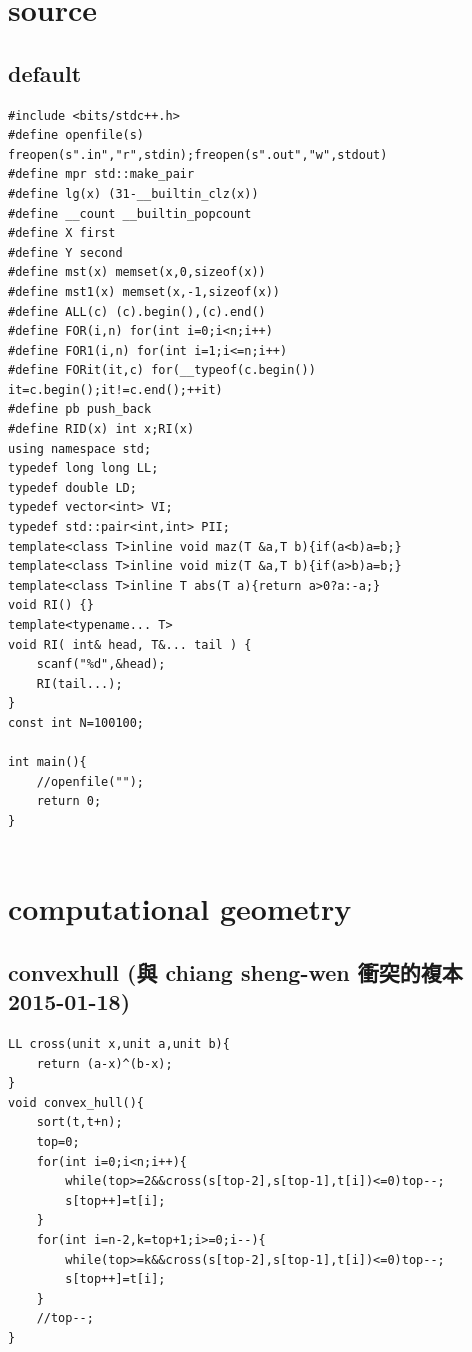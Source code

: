 \documentclass[10pt,twocolumn,oneside]{article}
\begin{document}
\pagestyle{fancy}
\fancyfoot{}
\fancyhead[R]{\thepage}
\renewcommand{\headrulewidth}{0.4pt}
\renewcommand{\contentsname}{Contents} 

\scriptsize
\tableofcontents

\section{source}
\subsection{default}
\begin{lstlisting}
#include <bits/stdc++.h>
#define openfile(s) freopen(s".in","r",stdin);freopen(s".out","w",stdout)
#define mpr std::make_pair
#define lg(x) (31-__builtin_clz(x))
#define __count __builtin_popcount
#define X first
#define Y second
#define mst(x) memset(x,0,sizeof(x))
#define mst1(x) memset(x,-1,sizeof(x))
#define ALL(c) (c).begin(),(c).end()
#define FOR(i,n) for(int i=0;i<n;i++)
#define FOR1(i,n) for(int i=1;i<=n;i++)
#define FORit(it,c) for(__typeof(c.begin()) it=c.begin();it!=c.end();++it)
#define pb push_back
#define RID(x) int x;RI(x)
using namespace std;
typedef long long LL;
typedef double LD;
typedef vector<int> VI;
typedef std::pair<int,int> PII;
template<class T>inline void maz(T &a,T b){if(a<b)a=b;}
template<class T>inline void miz(T &a,T b){if(a>b)a=b;}
template<class T>inline T abs(T a){return a>0?a:-a;}
void RI() {}
template<typename... T>
void RI( int& head, T&... tail ) {
    scanf("%d",&head);
    RI(tail...);
}
const int N=100100;

int main(){
	//openfile("");
	return 0;
}


\end{lstlisting}
\section{computational geometry}
\subsection{convexhull (與 chiang sheng-wen 衝突的複本 2015-01-18)}
\begin{lstlisting}
LL cross(unit x,unit a,unit b){
	return (a-x)^(b-x);
}
void convex_hull(){
	sort(t,t+n);
	top=0;
	for(int i=0;i<n;i++){
		while(top>=2&&cross(s[top-2],s[top-1],t[i])<=0)top--;
		s[top++]=t[i];
	}
	for(int i=n-2,k=top+1;i>=0;i--){
		while(top>=k&&cross(s[top-2],s[top-1],t[i])<=0)top--;
		s[top++]=t[i];
	}
	//top--;
}

\end{lstlisting}
\end{document}
